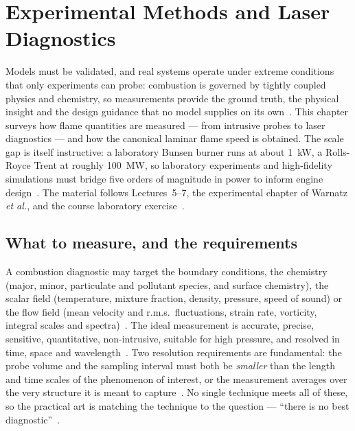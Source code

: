 \chapter{Experimental Methods and Laser Diagnostics}\label{ch:diagnostics}

Models must be validated, and real systems operate under extreme conditions that only experiments can probe: combustion is governed by tightly coupled physics and chemistry, so measurements provide the ground truth, the physical insight and the design guidance that no model supplies on its own~\cite{lecture5,lecture6}. This chapter surveys how flame quantities are measured --- from intrusive probes to laser diagnostics --- and how the canonical laminar flame speed is obtained. The scale gap is itself instructive: a laboratory Bunsen burner runs at about \SI{1}{kW}, a Rolls-Royce Trent at roughly \SI{100}{MW}, so laboratory experiments and high-fidelity simulations must bridge five orders of magnitude in power to inform engine design~\cite{lecture5}. The material follows Lectures~5--7, the experimental chapter of Warnatz \emph{et al.}, and the course laboratory exercise~\cite{lecture5,lecture6,lecture7,warnatz2006combustion,AE4262_LabExercise2026}.

\section{What to measure, and the requirements}

A combustion diagnostic may target the boundary conditions, the chemistry (major, minor, particulate and pollutant species, and surface chemistry), the scalar field (temperature, mixture fraction, density, pressure, speed of sound) or the flow field (mean velocity and r.m.s.\ fluctuations, strain rate, vorticity, integral scales and spectra)~\cite{lecture6}. The ideal measurement is accurate, precise, sensitive, quantitative, non-intrusive, suitable for high pressure, and resolved in time, space and wavelength~\cite{lecture6}. Two resolution requirements are fundamental: the probe volume and the sampling interval must both be \emph{smaller} than the length and time scales of the phenomenon of interest, or the measurement averages over the very structure it is meant to capture~\cite{lecture6}. No single technique meets all of these, so the practical art is matching the technique to the question --- ``there is no best diagnostic''~\cite{lecture6}.


